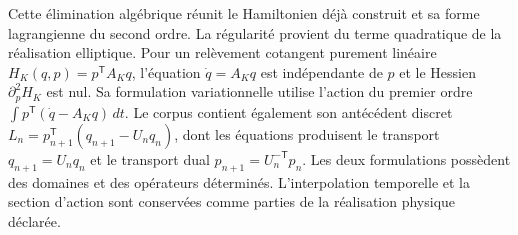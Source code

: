 Cette élimination algébrique réunit le Hamiltonien déjà construit et
sa forme lagrangienne du second ordre. La régularité provient du
terme quadratique de la réalisation elliptique. Pour un relèvement
cotangent purement linéaire \(H_K(q,p)=p^{\mathsf T}A_Kq\), l’équation
\(\dot q=A_Kq\) est indépendante de \(p\) et le Hessien
\(\partial_p^2H_K\) est nul. Sa formulation variationnelle utilise
l’action du premier ordre \(\int p^{\mathsf T}(\dot q-A_Kq)\,dt\).
Le corpus contient également son antécédent discret
\(L_n=p_{n+1}^{\mathsf T}(q_{n+1}-U_nq_n)\), dont les équations
produisent le transport \(q_{n+1}=U_nq_n\) et le transport dual
\(p_{n+1}=U_n^{-\mathsf T}p_n\). Les deux formulations possèdent
des domaines et des opérateurs déterminés. L’interpolation temporelle et la
section d’action sont conservées comme parties de la réalisation physique
déclarée.
